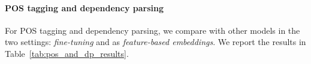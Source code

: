 \begin{table}[ht]
    \centering\small
    \caption{\textbf{NLI} accuracy on the French XNLI test set (best model selected on validation out of 10). Best scores in bold, second best underlined.\label{table:xnli}}
\end{table}




\paragraph{POS tagging and dependency parsing}
For POS tagging and dependency parsing, we compare \camembert with other models in the two settings: \textit{fine-tuning} and as \textit{feature-based embeddings}.
We report the results in Table~\ref{tab:pos_and_dp_results}.

